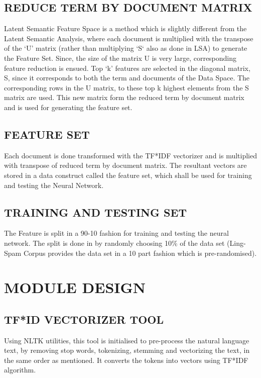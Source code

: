 \subsection{REDUCE TERM BY DOCUMENT MATRIX}
Latent Semantic Feature Space is a method which is slightly different from the Latent Semantic Analysis, where each document is multiplied with the transpose of the ‘U’ matrix (rather than multiplying ‘S‘ also as done in LSA) to generate the Feature Set. Since, the size of the matrix U is very large, corresponding feature reduction is ensued. Top ‘k’ features are selected in the diagonal matrix, S, since it corresponds to both the term and documents of the Data Space. The corresponding rows in the U matrix, to these top k highest elements from the S matrix are used. This new matrix form the reduced term by document matrix and is used for generating the feature set.

\subsection{FEATURE SET}
Each document is done transformed with the TF*IDF vectorizer and is multiplied with transpose of reduced term by  document matrix. The resultant vectors are stored in a data construct called the feature set, which shall be used for training and testing the Neural Network.

\subsection{TRAINING AND TESTING SET}
The Feature is split in a 90-10 fashion for training and testing the neural network. The split is done in by randomly choosing 10\% of the data set (Ling-Spam Corpus provides the data set in a 10 part fashion which is pre-randomised).
        

\section{MODULE DESIGN}

\subsection{TF*ID VECTORIZER TOOL}
Using NLTK utilities, this tool is initialised to pre-process the natural language text, by removing stop words, tokenizing, stemming and vectorizing the text, in the same order as mentioned. It converts the tokens into vectors using TF*IDF algorithm.

